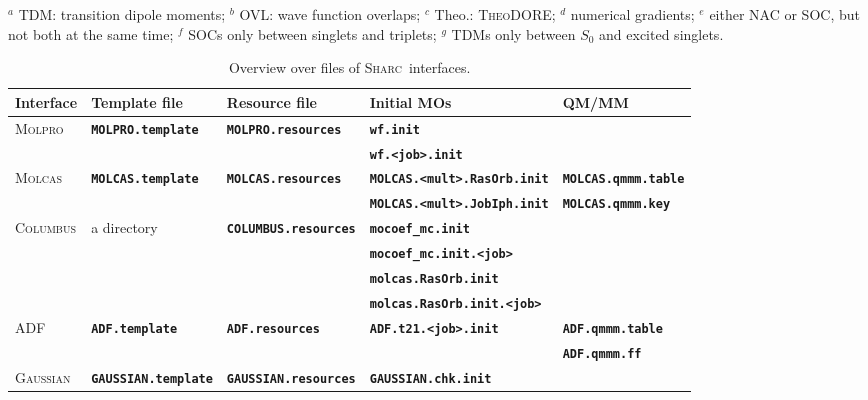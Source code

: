 \documentclass[a4paper,10pt,DIV=15,openany]{scrbook}
\newcommand{\sharc}{\textsc{Sharc}}
\newcommand{\ttt}[1]{\textbf{\texttt{#1}}}
\begin{document}
\begin{table}[htb]
  $^a$ TDM: transition dipole moments;
  $^b$ OVL: wave function overlaps;
  $^c$ Theo.: \textsc{TheoDORE};
  $^d$ numerical gradients;
  $^e$ either NAC or SOC, but not both at the same time;
  $^f$ SOCs only between singlets and triplets;
  $^g$ TDMs only between $S_0$ and excited singlets.
\end{table}



\begin{table}[htb]
  \centering
  \caption{Overview over files of \sharc\ interfaces.}
  \renewcommand{\tabcolsep}{5pt}
  \label{tab:interface_files}
  \begin{tabular}{lllll}
    \hline
    Interface           &Template file             &Resource file             &Initial MOs                     &QM/MM\\
    \hline
    \textsc{Molpro}     &\ttt{MOLPRO.template}     &\ttt{MOLPRO.resources}    &\ttt{wf.init}                   &\\
                        &                          &                          &\ttt{wf.<job>.init}             &\\
    \textsc{Molcas}     &\ttt{MOLCAS.template}     &\ttt{MOLCAS.resources}    &\ttt{MOLCAS.<mult>.RasOrb.init} &\ttt{MOLCAS.qmmm.table}\\
                        &                          &                          &\ttt{MOLCAS.<mult>.JobIph.init} &\ttt{MOLCAS.qmmm.key}\\
    \textsc{Columbus}   &a directory               &\ttt{COLUMBUS.resources}  &\ttt{mocoef\_mc.init}           &\\
                        &                          &                          &\ttt{mocoef\_mc.init.<job>}     &\\
                        &                          &                          &\ttt{molcas.RasOrb.init}        &\\
                        &                          &                          &\ttt{molcas.RasOrb.init.<job>}  &\\
    \textsc{ADF}        &\ttt{ADF.template}        &\ttt{ADF.resources}       &\ttt{ADF.t21.<job>.init}        &\ttt{ADF.qmmm.table}\\
                        &                          &                          &                                &\ttt{ADF.qmmm.ff}\\
    \textsc{Gaussian}   &\ttt{GAUSSIAN.template}   &\ttt{GAUSSIAN.resources}  &\ttt{GAUSSIAN.chk.init}         &\\

\end{tabular}
\end{table}
\end{document}
